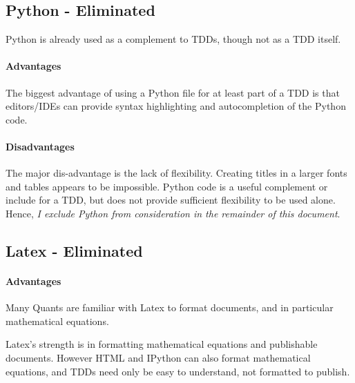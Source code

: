 \documentclass[12pt]{Report}
\begin{document}
\subsection{Python - Eliminated}
	Python is already used as a complement to TDDs, though not as a TDD itself.
	\paragraph{Advantages}
		The biggest advantage of using a Python file for at least part of a TDD 
	is that editors/IDEs can provide syntax highlighting and autocompletion of the Python code.
	
	\paragraph{Disadvantages}	
	The major dis-advantage is the lack of flexibility.  Creating titles in a larger fonts and tables appears to be impossible.  
	Python code is a useful complement or include for a TDD, but does not provide sufficient flexibility to be used alone.  
	Hence, \emph{I exclude Python from consideration in the remainder of this document}.


\subsection{Latex - Eliminated}
	\paragraph{Advantages}
	
	Many Quants are familiar with Latex to format documents, and in particular mathematical equations.
	
	Latex's strength is in formatting mathematical equations and publishable documents.  
	However HTML and IPython can also format mathematical equations, and TDDs need only be easy to understand, not formatted to publish.
	
\end{document}
